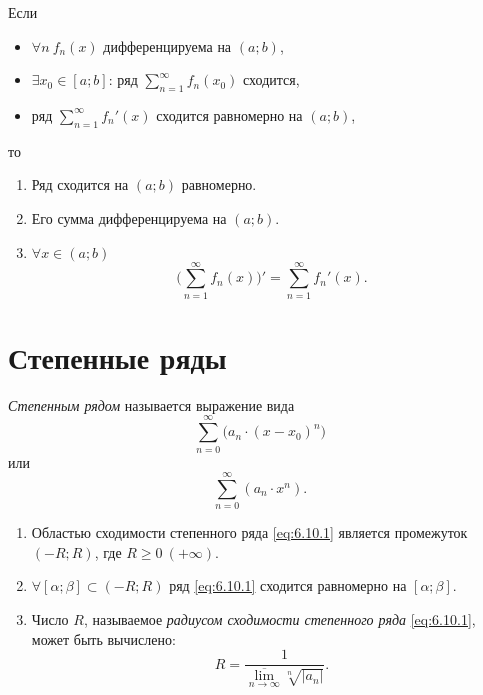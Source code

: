 \begin{corollary}
    Если
    \begin{itemize}
        \item $\forall n \ f_n(x)$ дифференцируема на $(a;b)$,
        \item $\exists x_0 \in [a;b]$: ряд $\sum_{n=1}^{\infty}f_n(x_0)$ сходится,
        \item ряд $\sum_{n=1}^{\infty}f_n'(x)$ сходится равномерно на $(a;b)$,
    \end{itemize}
    то \begin{enumerate}
        \item Ряд сходится на $(a;b)$ равномерно.
        \item Его сумма дифференцируема на $(a;b)$.
        \item $\forall x \in (a;b)$
              \[
                  \bigg(\sum_{n=1}^{\infty}f_n(x)\bigg)' = \sum_{n=1}^{\infty}f_n'(x).
              \]
    \end{enumerate}
\end{corollary}

\newpage

\section{Степенные ряды}

\begin{definition}
    \emph{Степенным рядом} называется выражение вида
    \[
        \sum_{n=0}^{\infty}\big(a_n\cdot (x-x_0)^n\big)
    \]
    или
    \begin{equation}\label{eq:6.10.1}
        \sum_{n=0}^{\infty}(a_n \cdot x^n).
    \end{equation}
\end{definition}

\begin{theorem}\label{theorem:6.10.1}\leavevmode
    \begin{enumerate}
        \item Областью сходимости степенного ряда \ref{eq:6.10.1} является промежуток $(-R;R)$, где $R \geqslant 0 \ (+ \infty)$.
        \item $\forall [\alpha;\beta] \subset (-R;R)$ ряд \ref{eq:6.10.1} сходится равномерно на $[\alpha;\beta]$.
        \item Число $R$, называемое \emph{радиусом сходимости степенного ряда} \ref{eq:6.10.1}, может быть вычислено:
              \[
                  R = \frac{1}{\underset{n\rightarrow\infty}{\overline{\lim}}\sqrt[n]{|a_n|}}.
              \]
    \end{enumerate}
\end{theorem}


